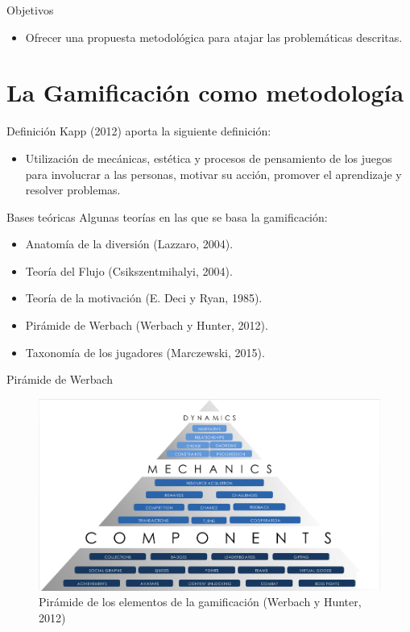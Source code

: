 \documentclass[10pt,notes,compress,usetitleprogressbar,aspectratio=1610]{beamer}
\begin{document}
\begin{frame}{Objetivos}
\begin{itemize}
	\item Ofrecer una propuesta metodológica para atajar las problemáticas descritas.
\end{itemize}
\end{frame}


\section{La Gamificación como metodología}

\begin{frame}{Definición}
Kapp (2012) aporta la siguiente definición:
\begin{itemize}
	\item Utilización de mecánicas, estética y procesos de pensamiento de los juegos para involucrar a las personas, motivar su acción, promover el aprendizaje y resolver problemas.
\end{itemize}
\end{frame}


\begin{frame}{Bases teóricas}
Algunas teorías en las que se basa la gamificación:
\begin{center}
\large
	\begin{itemize}
		\item Anatomía de la diversión (Lazzaro, 2004).
		\item Teoría del Flujo (Csikszentmihalyi, 2004).
		\item Teoría de la motivación (E. Deci y Ryan, 1985).
		\item Pirámide de Werbach (Werbach y Hunter, 2012).
		\item Taxonomía de los jugadores (Marczewski, 2015).
	\end{itemize}
\end{center}
\end{frame}

\begin{frame}{Pirámide de Werbach}
	\begin{figure}
		\includegraphics[scale=0.4]{../img/Pyramid.png}
		\caption{Pirámide de los elementos de la gamificación (Werbach y Hunter, 2012)}
	\end{figure}
\end{frame}
\end{document}
